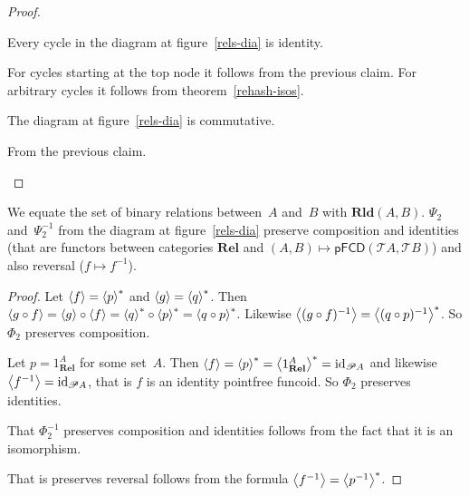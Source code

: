 \begin{proof}
\begin{claim}
Every cycle in the diagram at figure~\ref{rels-dia} is identity.
\end{claim}
\begin{claimproof}
For cycles starting at the top node it follows from the previous claim.
For arbitrary cycles it follows from theorem~\ref{rehash-isos}.
\end{claimproof}

\begin{claim}
The diagram at figure~\ref{rels-dia} is commutative.
\end{claim}
\begin{claimproof}
From the previous claim.
\end{claimproof}

\end{proof}

\begin{prop}
We equate the set of binary relations between~$A$ and~$B$ with $\mathbf{Rld}(A,B)$.
$\Psi_2$ and~$\Psi_2^{-1}$ from the diagram at figure~\ref{rels-dia} preserve composition and identities (that are functors
between categories $\mathbf{Rel}$ and $(A,B)\mapsto\mathsf{pFCD}(\mathscr{T}A,\mathscr{T}B)$) and also reversal ($f\mapsto f^{-1}$).
\end{prop}

\begin{proof}
Let $\left\langle f\right\rangle=\left\langle p\right\rangle ^{\ast}$ and $\left\langle g\right\rangle=\left\langle q\right\rangle ^{\ast}$. Then $\left\langle g\circ f\right\rangle=\left\langle g\right\rangle\circ\left\langle f\right\rangle=\left\langle q\right\rangle ^{\ast}\circ\left\langle p\right\rangle ^{\ast}=\left\langle q\circ p\right\rangle ^{\ast}$.
Likewise $\left\langle (g\circ f)^{-1}\right\rangle=\left\langle (q\circ p)^{-1}\right\rangle ^{\ast}$. So
$\Phi_2$ preserves composition.

Let $p=1_{\mathbf{Rel}}^{A}$ for some set~$A$. Then $\left\langle f\right\rangle=\left\langle p\right\rangle ^{\ast}=\left\langle 1_{\mathbf{Rel}}^{A}\right\rangle ^{\ast}=\operatorname{id}_{\mathscr{P} A}$
and likewise $\left\langle f^{-1}\right\rangle=\operatorname{id}_{\mathscr{P} A}$, that is $f$ is
an identity pointfree funcoid. So $\Phi_2$ preserves identities.

That $\Phi_2^{-1}$ preserves composition and identities follows from the fact that it is an isomorphism.

That is preserves reversal follows from the formula $\left\langle f^{-1}\right\rangle=\left\langle p^{-1}\right\rangle ^{\ast}$.
\end{proof}

